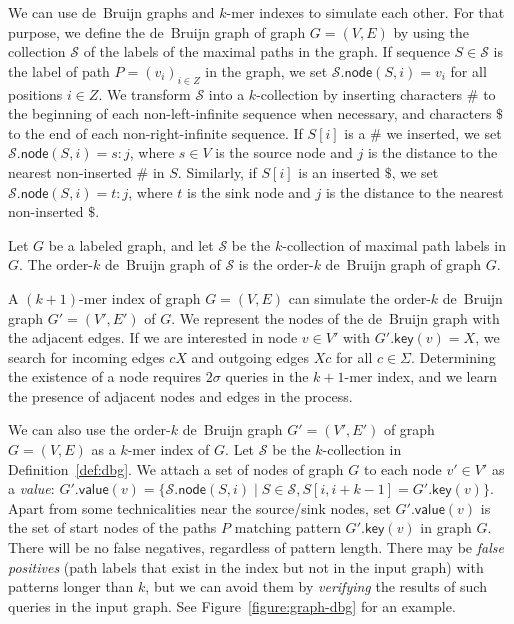 \documentclass[a4paper,UKenglish]{lipics-v2016}
\newcommand{\set}[1]{\ensuremath{\{ #1 \}}}
\newcommand{\gkey}{\ensuremath{\mathsf{key}}}
\newcommand{\gvalue}{\ensuremath{\mathsf{value}}}
\newcommand{\gnode}{\ensuremath{\mathsf{node}}}
\newcommand{\kmer}[1]{$#1$\nobreakdash-mer}
\newcommand{\kcollection}[1]{$#1$\nobreakdash-collection}
\newcommand{\orderk}[1]{order\nobreakdash-$#1$}
\begin{document}
We can use de~Bruijn graphs and \kmer{k} indexes to simulate each other. For that purpose, we define the de~Bruijn graph of graph $G = (V, E)$ by using the collection $\mathcal{S}$ of the labels of the maximal paths in the graph. If sequence $S \in \mathcal{S}$ is the label of path $P = (v_{i})_{i \in Z}$ in the graph, we set $\mathcal{S}.\gnode(S, i) = v_{i}$ for all positions $i \in Z$. We transform $\mathcal{S}$ into a \kcollection{k} by inserting characters $\#$ to the beginning of each non-left-infinite sequence when necessary, and characters $\$$ to the end of each non-right-infinite sequence. If $S[i]$ is a $\#$ we inserted, we set $\mathcal{S}.\gnode(S, i) = s:j$, where $s \in V$ is the source node and $j$ is the distance to the nearest non-inserted $\#$ in $S$. Similarly, if $S[i]$ is an inserted $\$$, we set $\mathcal{S}.\gnode(S, i) = t:j$, where $t$ is the sink node and $j$ is the distance to the nearest non-inserted $\$$.

\begin{definition}\label{def:dbg}
Let $G$ be a labeled graph, and let $\mathcal{S}$ be the \kcollection{k} of maximal path labels in $G$. The \orderk{k} de~Bruijn graph of $\mathcal{S}$ is the \orderk{k} de~Bruijn graph of graph $G$.
\end{definition}

A \kmer{(k+1)} index of graph $G = (V, E)$ can simulate the \orderk{k} de~Bruijn graph $G' = (V', E')$ of $G$. We represent the nodes of the de~Bruijn graph with the adjacent edges. If we are interested in node $v \in V'$ with $G'.\gkey(v) = X$, we search for incoming edges $cX$ and outgoing edges $Xc$ for all $c \in \Sigma$. Determining the existence of a node requires $2 \sigma$ queries in the \kmer{k+1} index, and we learn the presence of adjacent nodes and edges in the process.

We can also use the \orderk{k} de~Bruijn graph $G' = (V', E')$ of graph $G = (V, E)$ as a \kmer{k} index of $G$. Let $\mathcal{S}$ be the \kcollection{k} in Definition~\ref{def:dbg}. We attach a set of nodes of graph $G$ to each node $v' \in V'$ as a \emph{value}: $G'.\gvalue(v) = \set{ \mathcal{S}.\gnode(S, i) \mid S \in \mathcal{S}, S[i, i+k-1] = G'.\gkey(v)}.$ Apart from some technicalities near the source/sink nodes, set $G'.\gvalue(v)$ is the set of start nodes of the paths $P$ matching pattern $G'.\gkey(v)$ in graph $G$. There will be no false negatives, regardless of pattern length. There may be \emph{false positives} (path labels that exist in the index but not in the input graph) with patterns longer than $k$, but we can avoid them by \emph{verifying} the results of such queries in the input graph. See Figure~\ref{figure:graph-dbg} for an example.
\end{document}
